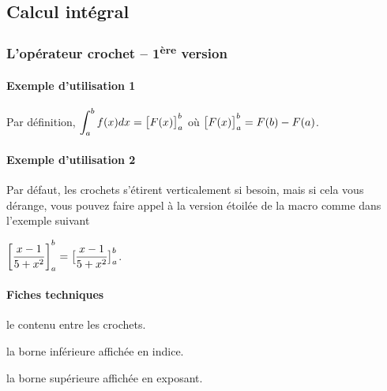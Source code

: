 \documentclass[12pt,a4paper]{article}
\newcommand\dd[1]{d#1}
\begin{document}

\subsection{Calcul intégral}

\subsubsection{L'opérateur crochet -- 1\textsuperscript{ère} version}

\paragraph{Exemple d'utilisation 1}

\begin{tcblisting}{}
Par définition, $\displaystyle \int_{a}^{b} f(x) \dd{x} = \hook{F(x)}{a}{b}$ où
$\hook{F(x)}{a}{b} = F(b) - F(a)$.
\end{tcblisting}


\paragraph{Exemple d'utilisation 2}

Par défaut, les crochets s'étirent verticalement si besoin, mais si cela vous dérange, vous pouvez faire appel à la version étoilée de la macro comme dans l'exemple suivant

\begin{tcblisting}{}
$\displaystyle \hook{\frac{x - 1}{5 + x^2}}{a}{b}
             = \hook*{\frac{x - 1}{5 + x^2}}{a}{b}$.
\end{tcblisting}


\paragraph{Fiches techniques}



 le contenu entre les crochets.

 la borne inférieure affichée en indice.

 la borne supérieure affichée en exposant.
\end{document}
